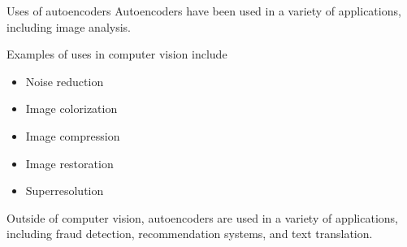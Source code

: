 \documentclass[9pt, aspectratio=169]{beamer}
\begin{document}
\begin{frame}
    {Uses of autoencoders}
    Autoencoders have been used in a variety of applications, including image analysis.

    Examples of uses in computer vision include
    \begin{itemize}
        \item Noise reduction
        \item Image colorization
        \item Image compression
        \item Image restoration
        \item Superresolution
    \end{itemize}

    Outside of computer vision, autoencoders are used in a variety of applications, including fraud detection, recommendation systems, and text translation.
\end{frame}
\end{document}
